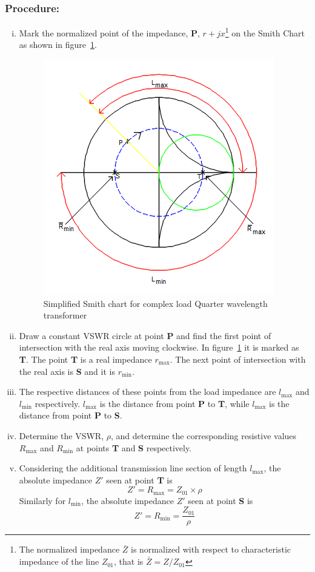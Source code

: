 \subsubsection*{Procedure:}
\begin{enumerate}[(i)]
\item Mark the normalized point of the impedance, \textbf{P}, $r + jx$\footnote{
The normalized impedance $ \bar{Z}$ is normalized with respect to characteristic impedance of the line $ Z_{01}$, that is $ \bar{Z} = Z/ Z_{01}$
} on the Smith Chart as shown in figure~\ref{fig:sinsmith}.
\begin{figure}[h]
\centering
\includegraphics[scale=0.6]{./graphics/sinsmith}
\caption{ Simplified Smith chart for complex load Quarter wavelength transformer}
\label{fig:sinsmith}
\end{figure}

\item Draw a constant VSWR circle at point \textbf{P} and find the first point of intersection with the real axis moving clockwise. In figure~\ref{fig:sinsmith} it is marked as \textbf{T}. The point \textbf{T} is a real impedance $r_\max$. The next point of intersection with the real axis is \textbf{S} and it is $r_\min$.
\item The respective distances of these points from the load impedance are $ l_\max$ and $ l_\min$ respectively. $ l_\max$ is the distance from point \textbf{P} to \textbf{T}, while $ l_\max$ is the distance from point \textbf{P} to \textbf{S}.
\item Determine the VSWR, $\rho$, and determine the corresponding resistive values $R_\max$ and $R_\min$ at points \textbf{T} and \textbf{S} respectively. 
\item Considering the additional transmission line section of length $ l_\max$, the absolute impedance $ Z'$ seen at point \textbf{T} is
\begin{equation}
Z' = R_\max = Z_{01}\times\rho
\end{equation}
Similarly for $ l_\min$, the absolute impedance $ Z'$ seen at point \textbf{S} is
\begin{equation}
Z' = R_\min = \frac{Z_{01}}{\rho}
\end{equation}
\end{enumerate}
